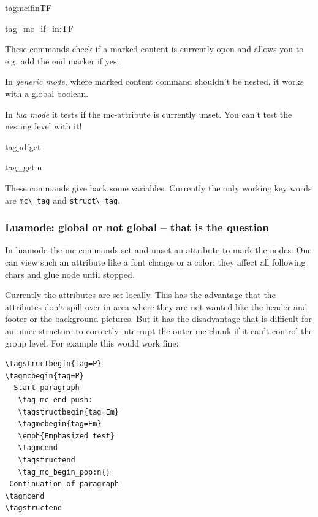 \documentclass[DIV=12,parskip=half-,bibliography=totoc]{scrartcl}
\begin{document}
\begin{docCommand}{tagmcifinTF}{}\end{docCommand}
\begin{docCommand}{tag_mc_if_in:TF}{}\end{docCommand}


These commands check if a marked content is currently open and allows you to e.g. add the end marker if yes.

In \emph{generic mode}, where marked content command shouldn't be nested, it works with a global boolean.

In \emph{lua mode} it tests if the mc-attribute is currently unset. You can't test the nesting level with it!


\begin{docCommand}{tagpdfget}{}\end{docCommand}
\begin{docCommand}{tag_get:n}{}\end{docCommand}


These commands give back some variables. Currently the only working key words are \verb+mc\_tag+ and \verb+struct\_tag+.

\subsubsection{Luamode: global or not global -- that is the question}\label{sec:global-local}

In luamode the mc-commands set and unset an attribute to mark the nodes. One can view such an attribute like a font change or a color: they affect all following chars and glue node until stopped.

Currently the attributes are set locally. This has the advantage that the attributes don't spill over in area where they are not wanted like the header and footer or the background pictures.
But it has the disadvantage that is difficult for an inner structure to correctly interrupt the outer
mc-chunk if it can't control the group level. For example this would work fine:

\begin{lstlisting}
\tagstructbegin{tag=P}
\tagmcbegin{tag=P}
  Start paragraph
   \tag_mc_end_push:
   \tagstructbegin{tag=Em}
   \tagmcbegin{tag=Em}
   \emph{Emphasized test}
   \tagmcend
   \tagstructend
   \tag_mc_begin_pop:n{}
 Continuation of paragraph
\tagmcend
\tagstructend
\end{lstlisting}
\end{document}
